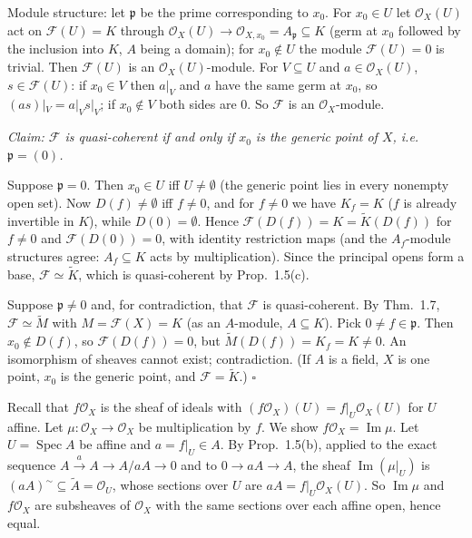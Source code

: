 \documentclass[11pt]{article}
\begin{document}
Module structure: let $\mathfrak{p}$ be the prime corresponding to $x_0$. For $x_0\in U$ let $\mathcal{O}_X(U)$ act on $\mathcal{F}(U)=K$ through $\mathcal{O}_X(U)\to\mathcal{O}_{X,x_0}=A_\mathfrak{p}\subseteq K$ (germ at $x_0$ followed by the inclusion into $K$, $A$ being a domain); for $x_0\notin U$ the module $\mathcal{F}(U)=0$ is trivial. Then $\mathcal{F}(U)$ is an $\mathcal{O}_X(U)$-module. For $V\subseteq U$ and $a\in\mathcal{O}_X(U)$, $s\in\mathcal{F}(U)$: if $x_0\in V$ then $a|_V$ and $a$ have the same germ at $x_0$, so $(as)|_V=a|_Vs|_V$; if $x_0\notin V$ both sides are $0$. So $\mathcal{F}$ is an $\mathcal{O}_X$-module.

\emph{Claim: $\mathcal{F}$ is quasi-coherent if and only if $x_0$ is the generic point of $X$, i.e.\ $\mathfrak{p}=(0)$.}

Suppose $\mathfrak{p}=0$. Then $x_0\in U$ iff $U\neq\emptyset$ (the generic point lies in every nonempty open set). Now $D(f)\neq\emptyset$ iff $f\neq0$, and for $f\neq0$ we have $K_f=K$ ($f$ is already invertible in $K$), while $D(0)=\emptyset$. Hence $\mathcal{F}(D(f))=K=\widetilde K(D(f))$ for $f\neq0$ and $\mathcal{F}(D(0))=0$, with identity restriction maps (and the $A_f$-module structures agree: $A_f\subseteq K$ acts by multiplication). Since the principal opens form a base, $\mathcal{F}\simeq\widetilde K$, which is quasi-coherent by Prop.~1.5(c).

Suppose $\mathfrak{p}\neq0$ and, for contradiction, that $\mathcal{F}$ is quasi-coherent. By Thm.~1.7, $\mathcal{F}\simeq\widetilde M$ with $M=\mathcal{F}(X)=K$ (as an $A$-module, $A\subseteq K$). Pick $0\neq f\in\mathfrak{p}$. Then $x_0\notin D(f)$, so $\mathcal{F}(D(f))=0$, but $\widetilde M(D(f))=K_f=K\neq0$. An isomorphism of sheaves cannot exist; contradiction. (If $A$ is a field, $X$ is one point, $x_0$ is the generic point, and $\mathcal{F}=\widetilde K$.) \hfill$\square$

\pf
Recall that $f\mathcal{O}_X$ is the sheaf of ideals with $(f\mathcal{O}_X)(U)=f|_U\mathcal{O}_X(U)$ for $U$ affine. Let $\mu:\mathcal{O}_X\to\mathcal{O}_X$ be multiplication by $f$. We show $f\mathcal{O}_X=\operatorname{Im}\mu$. Let $U=\operatorname{Spec}A$ be affine and $a=f|_U\in A$. By Prop.~1.5(b), applied to the exact sequence $A\xrightarrow{a}A\to A/aA\to0$ and to $0\to aA\to A$, the sheaf $\operatorname{Im}(\mu|_U)$ is $(aA)^\sim\subseteq\widetilde A=\mathcal{O}_U$, whose sections over $U$ are $aA=f|_U\mathcal{O}_X(U)$. So $\operatorname{Im}\mu$ and $f\mathcal{O}_X$ are subsheaves of $\mathcal{O}_X$ with the same sections over each affine open, hence equal.
\end{document}
